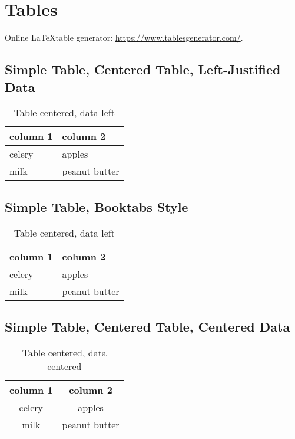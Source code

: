 \documentclass[]{scrartcl}
\begin{document}
	
\section{Tables}

Online \LaTeX table generator: \href{https://www.tablesgenerator.com/}{https://www.tablesgenerator.com/}.

\subsection{Simple Table, Centered Table, Left-Justified Data}

\begin{table}[h!]
	\centering
	\begin{tabular}{ll}
		column 1 & column 2 \\
		\hline
		celery & apples \\
		milk & peanut butter 
	\end{tabular}
	\caption{Table centered, data left}\label{tab:center-left}
\end{table}

\subsection{Simple Table, Booktabs Style}


\begin{table}[h!]
	\centering
	\begin{tabular}{@{}ll@{}}
		\toprule
		column 1 & column 2 \\
		\hline
		celery & apples \\
		milk & peanut butter 
	\end{tabular}
	\caption{Table centered, data left}\label{tab:booktabs}
\end{table}

\subsection{Simple Table, Centered Table, Centered Data}

\begin{table}[h!]
	\centering
	\begin{tabular}{cc}
		column 1 & column 2 \\
		\hline
		celery & apples \\
		milk & peanut butter 
	\end{tabular}
	\caption{Table centered, data centered}\label{tab:center-center}
\end{table}
\end{document}
